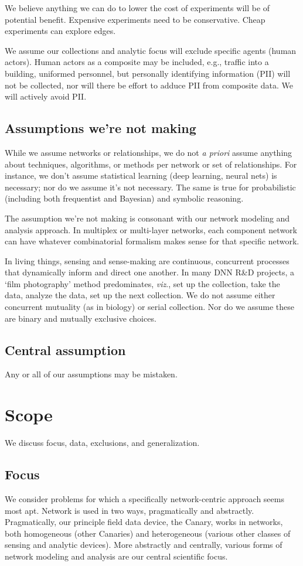 \documentclass{article} %
\begin{document}
We believe anything we can do to lower the cost of experiments will be of potential benefit. Expensive experiments need to be conservative. Cheap experiments can explore edges. 

We assume our collections and analytic focus will exclude specific agents (human actors). Human actors as a composite may be included, e.g., traffic into a building, uniformed personnel, but personally identifying information (PII) will not be collected, nor will there be effort to adduce PII from composite data. We will actively avoid PII.

\subsection{Assumptions we're not making}
While we assume networks or relationships, we do not \textit{a priori} assume anything about techniques, algorithms, or methods per network or set of relationships. For instance, we don't assume statistical learning (deep learning, neural nets) is necessary; nor do we assume it's not necessary. The same is true for probabilistic (including both frequentist and Bayesian) and symbolic reasoning. 

The assumption we're not making is consonant with our network modeling and analysis approach. In multiplex or multi-layer networks, each component network can have whatever combinatorial formalism makes sense for that specific network. 

In living things, sensing and sense-making are continuous, concurrent processes that dynamically inform and direct one another. In many DNN R\&D projects, a `film photography' method predominates, \textit{viz}., set up the collection, take the data, analyze the data, set up the next collection. We do not assume either concurrent mutuality (as in biology) or serial collection. Nor do we assume these are binary and mutually exclusive choices.

\subsection{Central assumption}
Any or all of our assumptions may be mistaken.


\pagebreak\section{Scope}
We discuss focus, data, exclusions, and generalization.

\subsection{Focus}
We consider problems for which a specifically network-centric approach seems most apt. Network is used in two ways, pragmatically and abstractly. Pragmatically, our principle field data device, the Canary, works in networks, both homogeneous (other Canaries) and heterogeneous (various other classes of sensing and analytic devices). More abstractly and centrally, various forms of network modeling and analysis are our central scientific focus. 
\end{document}
